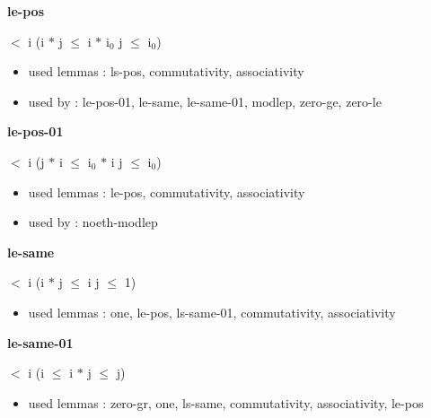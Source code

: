 \documentclass[a4paper]{article}
\begin{document}
\medskip

\bigskip

{\large\bf le-pos}

\medskip

  $<$ i \Imp (i $*$ j $\le$ i $*$ $\mbox{i}_{0}$ \Equiv j $\le$ $\mbox{i}_{0}$)

\begin{itemize}


\item       used lemmas  : ls-pos, commutativity, associativity
\item       used by      : le-pos-01, le-same, le-same-01, modlep, zero-ge, zero-le

\end{itemize}

\medskip

\bigskip

{\large\bf le-pos-01}

\medskip

  $<$ i \Imp (j $*$ i $\le$ $\mbox{i}_{0}$ $*$ i \Equiv j $\le$ $\mbox{i}_{0}$)

\begin{itemize}


\item       used lemmas  : le-pos, commutativity, associativity
\item       used by      : noeth-modlep

\end{itemize}

\medskip

\bigskip

{\large\bf le-same}

\medskip

  $<$ i \Imp (i $*$ j $\le$ i \Equiv j $\le$ 1)

\begin{itemize}


\item       used lemmas  : one, le-pos, ls-same-01, commutativity, associativity

\end{itemize}

\medskip

\bigskip

{\large\bf le-same-01}

\medskip

  $<$ i \Imp (i $\le$ i $*$ j  $\le$ j)

\begin{itemize}


\item       used lemmas  : zero-gr, one, ls-same, commutativity, associativity, le-pos

\end{itemize}
\end{document}
